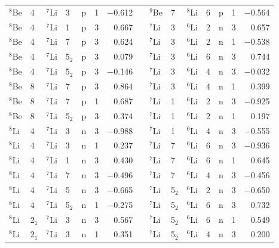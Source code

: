 \documentclass[10pt]{iopart}
\begin{document}
\begin{table}[tp]
\begin{tabular*}{\textwidth}{@{\extracolsep{\fill}}llllllrl@{\extracolsep{\fill}}llllllr@{\extracolsep{\fill}}}
$^8$Be  & 4  & $^7$Li   & 3   & p       & 1   & $-$0.612 &  & $^9$Be  & 7  & $^8$Li    & 6   & p       & 1   & $-$0.564  \\
$^8$Be  & 4  & $^7$Li   & 1   & p       & 3   & 0.667  &  & $^7$Li  & 3  & $^6$Li   & 2   & n       & 3   & 0.657   \\
$^8$Be  & 4  & $^7$Li   & 7   & p       & 3   & 0.624  &  & $^7$Li  & 3  & $^6$Li   & 2   & n       & 1   & $-$0.538  \\
$^8$Be  & 4  & $^7$Li   & 5$_2$   & p       & 3   & 0.079  &  & $^7$Li  & 3  & $^6$Li   & 6   & n       & 3   & 0.744   \\
$^8$Be  & 4  & $^7$Li   & 5$_2$   & p       & 3   & $-$0.146 &  & $^7$Li  & 3  & $^6$Li   & 4   & n       & 3   & $-$0.032  \\
$^8$Be  & 8  & $^7$Li   & 7   & p       & 3   & 0.864  &  & $^7$Li  & 3  & $^6$Li   & 4   & n       & 1   & 0.399   \\
$^8$Be  & 8  & $^7$Li   & 7   & p       & 1   & 0.687  &  & $^7$Li  & 1  & $^6$Li   & 2   & n       & 3   & $-$0.925  \\
$^8$Be  & 8  & $^7$Li   & 5$_2$   & p       & 3   & 0.374  &  & $^7$Li  & 1  & $^6$Li   & 2   & n       & 1   & 0.197   \\
$^8$Li  & 4  & $^7$Li   & 3   & n       & 3   & $-$0.988 &  & $^7$Li  & 1  & $^6$Li   & 4   & n       & 3   & $-$0.555  \\
$^8$Li  & 4  & $^7$Li   & 3   & n       & 1   & 0.237  &  & $^7$Li  & 7  & $^6$Li   & 6   & n       & 3   & $-$0.936  \\
$^8$Li  & 4  & $^7$Li   & 1   & n       & 3   & 0.430   &  & $^7$Li  & 7  & $^6$Li   & 6   & n       & 1   & 0.645   \\
$^8$Li  & 4  & $^7$Li   & 7   & n       & 3   & $-$0.496 &  & $^7$Li  & 7  & $^6$Li   & 4   & n       & 3   & $-$0.456  \\
$^8$Li  & 4  & $^7$Li   & 5   & n       & 3   & $-$0.665 &  & $^7$Li  & 5$_2$  & $^6$Li   & 2   & n       & 3   & $-$0.650   \\
$^8$Li  & 4  & $^7$Li   & 5$_2$   & n       & 1   & $-$0.275 &  & $^7$Li  & 5$_2$  & $^6$Li   & 6   & n       & 3   & 0.732   \\
$^8$Li  & 2$_1$  & $^7$Li   & 3   & n       & 3   & 0.567  &  & $^7$Li  & 5$_2$  & $^6$Li   & 6   & n       & 1   & 0.549   \\
$^8$Li  & 2$_1$  & $^7$Li   & 3   & n       & 1   & 0.351  &  & $^7$Li  & 5$_2$  & $^6$Li   & 4   & n       & 3   & 0.200     \\

\end{tabular*}
\end{table}
\end{document}
